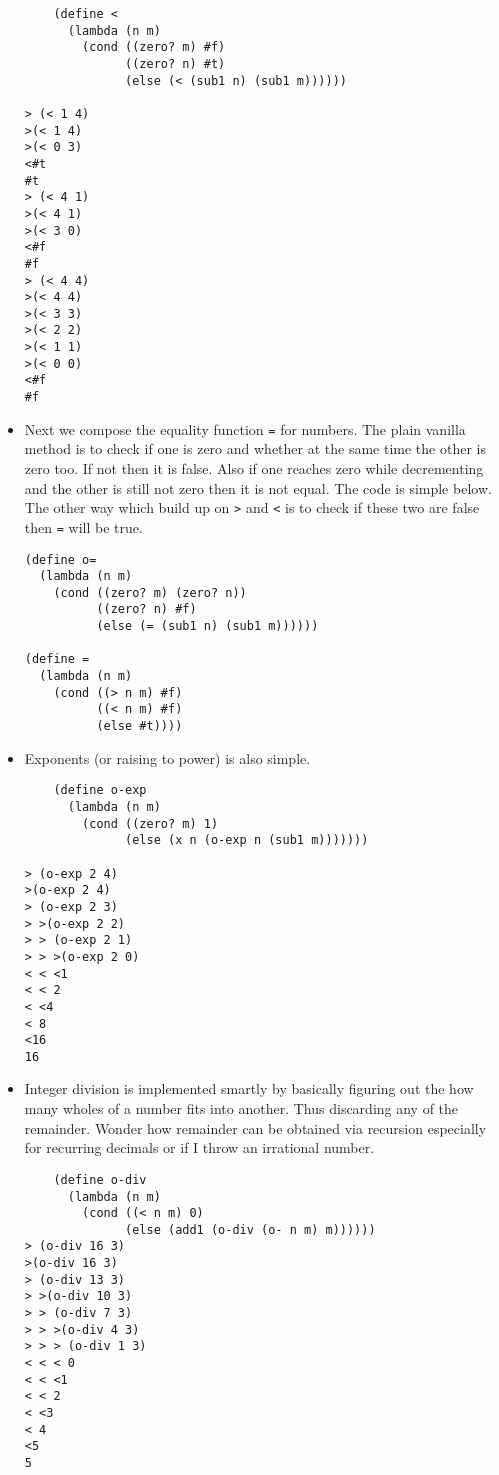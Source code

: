\documentclass[11pt]{article}
\begin{document}
\begin{itemize}
\begin{verbatim}
    (define <
      (lambda (n m)
        (cond ((zero? m) #f)
              ((zero? n) #t)
              (else (< (sub1 n) (sub1 m))))))

> (< 1 4)
>(< 1 4)
>(< 0 3)
<#t
#t
> (< 4 1)
>(< 4 1)
>(< 3 0)
<#f
#f
> (< 4 4)
>(< 4 4)
>(< 3 3)
>(< 2 2)
>(< 1 1)
>(< 0 0)
<#f
#f

\end{verbatim}

\item Next we compose the equality function \texttt{=} for numbers. The plain vanilla method is to check if one is zero and whether at the same time the
other is zero too. If not then it is false. Also if one reaches zero while decrementing and the other is still not zero then it is not equal.
The code is simple below. The other way which build up on \texttt{>} and \texttt{<} is to check if these two are false then \texttt{=} will be true.
\begin{verbatim}
(define o=
  (lambda (n m)
    (cond ((zero? m) (zero? n))
          ((zero? n) #f)
          (else (= (sub1 n) (sub1 m))))))

(define =
  (lambda (n m)
    (cond ((> n m) #f)
          ((< n m) #f)
          (else #t))))

\end{verbatim}

\item Exponents (or raising to power) is also simple.
\begin{verbatim}
    (define o-exp
      (lambda (n m)
        (cond ((zero? m) 1)
              (else (x n (o-exp n (sub1 m)))))))

> (o-exp 2 4)
>(o-exp 2 4)
> (o-exp 2 3)
> >(o-exp 2 2)
> > (o-exp 2 1)
> > >(o-exp 2 0)
< < <1
< < 2
< <4
< 8
<16
16

\end{verbatim}

\item Integer division is implemented smartly by basically figuring out the how many wholes of a number fits into another. Thus discarding any of the
remainder. Wonder how remainder can be obtained via recursion especially for recurring decimals or if I throw an irrational number.
\begin{verbatim}
    (define o-div
      (lambda (n m)
        (cond ((< n m) 0)
              (else (add1 (o-div (o- n m) m))))))
> (o-div 16 3)
>(o-div 16 3)
> (o-div 13 3)
> >(o-div 10 3)
> > (o-div 7 3)
> > >(o-div 4 3)
> > > (o-div 1 3)
< < < 0
< < <1
< < 2
< <3
< 4
<5
5


\end{verbatim}
\end{itemize}
\end{document}
